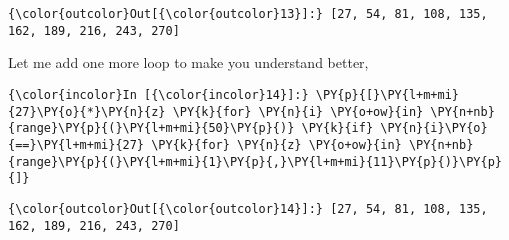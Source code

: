             \begin{Verbatim}[commandchars=\\\{\}]
{\color{outcolor}Out[{\color{outcolor}13}]:} [27, 54, 81, 108, 135, 162, 189, 216, 243, 270]
\end{Verbatim}
        
    Let me add one more loop to make you understand better,

    \begin{Verbatim}[commandchars=\\\{\}]
{\color{incolor}In [{\color{incolor}14}]:} \PY{p}{[}\PY{l+m+mi}{27}\PY{o}{*}\PY{n}{z} \PY{k}{for} \PY{n}{i} \PY{o+ow}{in} \PY{n+nb}{range}\PY{p}{(}\PY{l+m+mi}{50}\PY{p}{)} \PY{k}{if} \PY{n}{i}\PY{o}{==}\PY{l+m+mi}{27} \PY{k}{for} \PY{n}{z} \PY{o+ow}{in} \PY{n+nb}{range}\PY{p}{(}\PY{l+m+mi}{1}\PY{p}{,}\PY{l+m+mi}{11}\PY{p}{)}\PY{p}{]}
\end{Verbatim}

            \begin{Verbatim}[commandchars=\\\{\}]
{\color{outcolor}Out[{\color{outcolor}14}]:} [27, 54, 81, 108, 135, 162, 189, 216, 243, 270]
\end{Verbatim}
        

  \newpage
  
    
    
    
    
